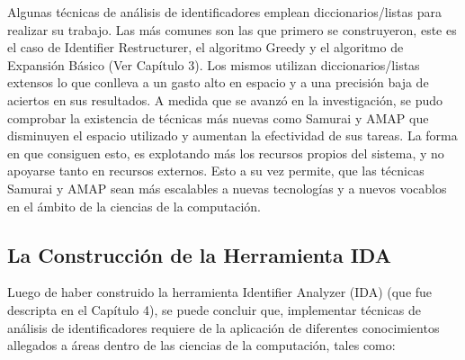 Algunas técnicas de análisis de identificadores emplean diccionarios/listas para realizar su trabajo. Las más comunes son las que primero se construyeron, este es el caso de Identifier Restructurer, el algoritmo Greedy y el algoritmo de Expansión Básico (Ver Capítulo 3). Los mismos utilizan diccionarios/listas extensos lo que conlleva a un gasto alto en espacio y a una precisión baja de aciertos en sus resultados. A medida que se avanzó en la investigación, se pudo comprobar la existencia de técnicas más nuevas como Samurai y AMAP que disminuyen el espacio utilizado y aumentan la efectividad de sus tareas. La forma en que consiguen esto, es explotando más los recursos propios del sistema, y no apoyarse tanto en recursos externos. Esto a su vez permite, que las técnicas Samurai y AMAP sean más escalables a nuevas tecnologías y a nuevos vocablos en el ámbito de la ciencias de la computación.

\subsection{La Construcción de la Herramienta IDA}

Luego de haber construido la herramienta Identifier Analyzer (IDA) (que fue descripta en el Capítulo 4), se puede concluir que, implementar técnicas de análisis de identificadores requiere de la aplicación de diferentes conocimientos allegados a áreas dentro de las ciencias de la computación, tales como:

